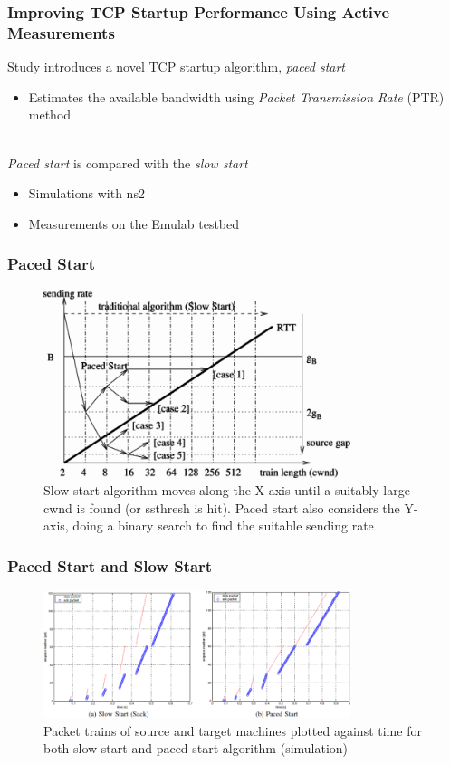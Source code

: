 \documentclass{beamer}
\begin{document}
\begin{frame}
\frametitle{Improving TCP Startup Performance Using Active Measurements}
Study introduces a novel TCP startup algorithm, \textit{paced start}
\begin{itemize}
	\item Estimates the available bandwidth using \textit{Packet Transmission Rate} (PTR) method\\~\\
\end{itemize}

\textit{Paced start} is compared with the \textit{slow start}
\begin{itemize}
	\item Simulations with ns2
	\item Measurements on the Emulab testbed
\end{itemize}

\end{frame}

\begin{frame}
\frametitle{Paced Start}
\begin{figure}
	\includegraphics[width=0.8\textwidth]{images/hu03_paced_start_search.png}
	\caption{Slow start algorithm moves along the X-axis until a suitably large cwnd is found (or ssthresh is hit). Paced start also considers the Y-axis, doing a binary search to find the suitable sending rate}
\end{figure}
\end{frame}

\begin{frame}
\frametitle{Paced Start and Slow Start}
\begin{figure}
	\includegraphics[width=0.8\textwidth]{images/hu03_PTR.png}
	\caption{Packet trains of source and target machines plotted against time for both slow start and paced start algorithm (simulation)}
\end{figure}
\end{frame}
\end{document}
